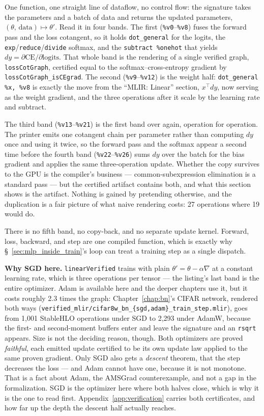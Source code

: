 \noindent One function, one straight line of dataflow, no control flow: the
signature takes the parameters and a batch of data and returns the
updated parameters, $(\theta,\,\text{data}) \mapsto \theta'$. Read it in
four bands. The first (\texttt{\%v0}--\texttt{\%v8}) fuses the forward pass and the
loss cotangent, so it holds \texttt{dot\_general} for the logits, the
\texttt{exp}/\texttt{reduce}/\texttt{divide} softmax, and the
\texttt{subtract \%onehot} that yields
$dy = \partial\mathrm{CE}/\partial\text{logits}$. That whole band is the
rendering of a single verified graph, \texttt{lossCotGraph}, certified
equal to the softmax--cross-entropy gradient by
\texttt{lossCotGraph\_isCEgrad}. The second (\texttt{\%v9}--\texttt{\%v12})
is the weight half: \texttt{dot\_general \%x, \%v8} is exactly the move
from the ``MLIR: Linear'' section, $x^{\!\top} dy$, now serving as the
weight gradient, and the three operations after it scale by the learning
rate and subtract.

The third band (\texttt{\%v13}--\texttt{\%v21}) is the first band over
again, operation for operation. The printer emits one cotangent chain per
parameter rather than computing $dy$ once and using it twice, so the
forward pass and the softmax appear a second time before the fourth band
(\texttt{\%v22}--\texttt{\%v26}) sums $dy$ over the batch for the bias
gradient and applies the same three-operation update. Whether the copy
survives to the GPU is the compiler's business --- common-subexpression
elimination is a standard pass --- but the certified artifact contains
both, and what this section shows is the artifact. Nothing is gained by
pretending otherwise, and the duplication is a fair picture of what naive
rendering costs: 27 operations where 19 would do.

There is no fifth band, no copy-back, and no separate update kernel.
Forward, loss, backward, and step are one compiled function, which is
exactly why \S~\ref{sec:mlp_inside_train}'s loop can treat a training
step as a single dispatch.

\medskip\noindent \textbf{Why SGD here.} \texttt{linearVerified} trains
with plain $\theta' = \theta - \alpha\nabla$ at a constant learning rate,
which is three operations per tensor --- the listing's last band is the
entire optimizer. Adam is available here and the deeper chapters use it,
but it costs roughly 2.3 times the graph: Chapter~\ref{chap:bn}'s CIFAR network, rendered both ways
(\texttt{verified\_mlir/cifar8w\_bn\_\{sgd,adam\}\_train\_step.mlir}), goes
from 1,001 StableHLO operations under SGD to 2,293 under AdamW, because the first- and second-moment buffers
enter and leave the signature and an \texttt{rsqrt} appears. Size is not
the deciding reason, though. Both optimizers are proved \emph{faithful},
each emitted update certified to be its own update law applied to the
same proven gradient. Only SGD also gets a \emph{descent} theorem, that
the step decreases the loss --- and Adam cannot have one, because it is
not monotone. That is a fact about Adam, the AMSGrad counterexample, and
not a gap in the formalization. SGD is the optimizer here where both
halves close, which is why it is the one to read first.
Appendix~\ref{app:verification} carries both certificates, and how far up
the depth the descent half actually reaches.

